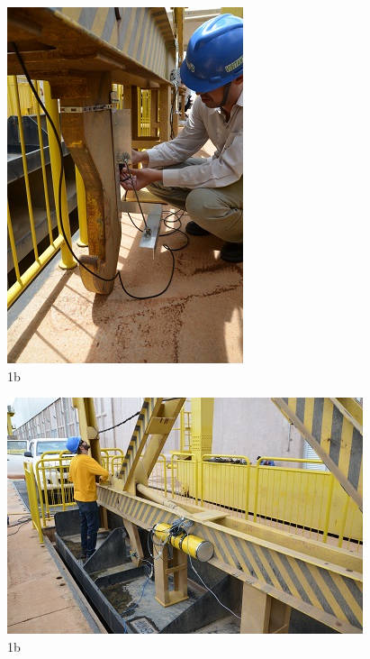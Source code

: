 \begin{figure}[h!]
  \centering
  \includegraphics[width=1\linewidth]{Fotos/Novembro2014/4.jpg}
  \caption{1b}
  \label{nov20134}
\end{figure}

\begin{figure}[h!]
  \centering
  \includegraphics[width=1\linewidth]{Fotos/Novembro2014/5.jpg}
  \caption{1b}
  \label{nov20134}
\end{figure}

